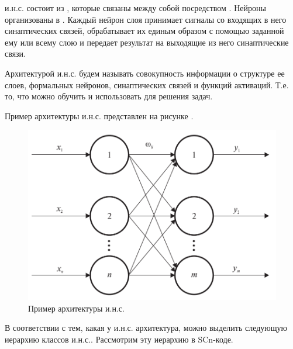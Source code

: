 и.н.с. состоит из , которые связаны между собой посредством . Нейроны организованы в . Каждый нейрон слоя принимает сигналы со входящих в него синаптических связей, обрабатывает их единым образом с помощью заданной ему или всему слою  и передает результат на выходящие из него синаптические связи.

Архитектурой и.н.с. будем называть совокупность информации о структуре ее слоев, формальных нейронов, синаптических связей и функций активаций. Т.е. то, что можно обучить и использовать для решения задач.

Пример архитектуры и.н.с. представлен на рисунке .

\begin{figure}[H]
	\centering
	\includegraphics[scale=0.3]{author/part3/figures/neural_network.png}
	\caption{Пример архитектуры и.н.с.}
	\label{fig:nn_example}
\end{figure}

В соответствии с тем, какая у и.н.с. архитектура, можно выделить следующую иерархию классов и.н.с.. Рассмотрим эту иерархию в SCn-коде.

